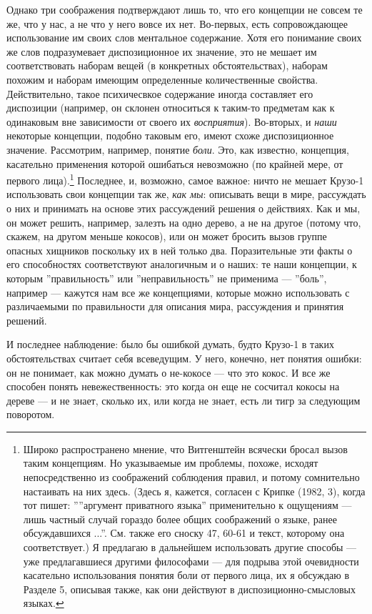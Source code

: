 \documentclass[11pt]{book}
\begin{document}
Однако три соображения подтверждают лишь то, что его концепции не совсем те же, что у нас, а не что у него вовсе их нет. Во-первых, есть сопровождающее использование им своих слов ментальное содержание. Хотя его понимание своих же слов подразумевает диспозиционное их значение, это не мешает им соответствовать наборам вещей (в конкретных обстоятельствах), наборам похожим и наборам имеющим определенные количественные свойства. Действительно, такое психичесвкое содержание иногда составляет его диспозиции (например, он склонен относиться к таким-то предметам как к одинаковым вне зависимости от своего их \textit{восприятия}). Во-вторых, и \textit{наши} некоторые концепции, подобно таковым его, имеют схоже диспозиционное значение. Рассмотрим, например, понятие \textit{боли}. Это, как известно, концепция, касательно применения которой ошибаться невозможно (по крайней мере, от первого лица).\footnote{Широко распространено мнение, что Витгенштейн всячески бросал вызов таким концепциям. Но указываемые им проблемы, похоже, исходят непосредственно из соображений соблюдения правил, и потому сомнительно настаивать на них здесь. (Здесь я, кажется, согласен с Крипке (1982, 3), когда тот пишет: ''''аргумент приватного языка'' применительно к ощущениям --- лишь частный случай гораздо более общих соображений о языке, ранее обсуждавшихся ...''. См. также его сноску 47, 60-61 и текст, которому она соответствует.) Я предлагаю в дальнейшем использовать другие способы --- уже предлагавшиеся другими философами --- для подрыва этой очевидности касательно использования понятия боли от первого лица, их я обсуждаю в Разделе 5, описывая также, как они действуют в диспозиционно-смысловых языках.} Последнее, и, возможно, самое важное: ничто не мешает Крузо-1 использовать свои концепции так же, \textit{как мы}: описывать вещи в мире, рассуждать о них и принимать на основе этих рассуждений решения о действиях. Как и мы, он может решить, например, залезть на одно дерево, а не на другое (потому что, скажем, на другом меньше кокосов), или он может бросить вызов группе опасных хищников поскольку их в ней только два. Поразительные эти факты о его способностях соответствуют аналогичным и о наших: те наши концепции, к которым ''правильность'' или ''неправильность'' не применима --- ''боль'', например --- кажутся нам все же концепциями, которые можно использовать с различаемыми по правильности для описания мира, рассуждения и принятия решений.

И последнее наблюдение: было бы ошибкой думать, будто Крузо-1 в таких обстоятельствах считает себя всеведущим. У него, конечно, нет понятия ошибки: он не понимает, как можно думать о не-кокосе --- что это кокос. И все же способен понять невежественность: это когда он еще не сосчитал кокосы на дереве --- и не знает, сколько их, или когда не знает, есть ли тигр за следующим поворотом.
\end{document}
